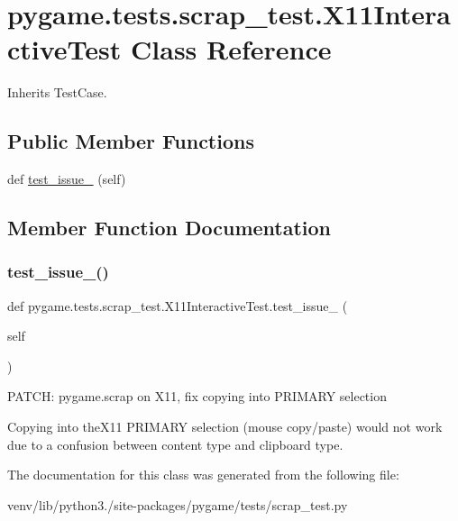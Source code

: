\hypertarget{classpygame_1_1tests_1_1scrap__test_1_1_x11_interactive_test}{}\section{pygame.\+tests.\+scrap\+\_\+test.\+X11\+Interactive\+Test Class Reference}
\label{classpygame_1_1tests_1_1scrap__test_1_1_x11_interactive_test}


Inherits Test\+Case.

\subsection*{Public Member Functions}
\begin{DoxyCompactItemize}
\item 
def \hyperlink{classpygame_1_1tests_1_1scrap__test_1_1_x11_interactive_test_a75341b3a575e637a2e64532f6d7127f6}{test\+\_\+issue\+\_} (self)
\end{DoxyCompactItemize}


\subsection{Member Function Documentation}
\mbox{\label{classpygame_1_1tests_1_1scrap__test_1_1_x11_interactive_test_a75341b3a575e637a2e64532f6d7127f6}} 
\subsubsection{\texorpdfstring{test\+\_\+issue\+\_()}{test\_issue\_208()}}
{\footnotesize\ttfamily def pygame.\+tests.\+scrap\+\_\+test.\+X11\+Interactive\+Test.\+test\+\_\+issue\+\_ (\begin{DoxyParamCaption}\item[{}]{self }\end{DoxyParamCaption})}

\begin{DoxyVerb}PATCH: pygame.scrap on X11, fix copying into PRIMARY selection

   Copying into theX11 PRIMARY selection (mouse copy/paste) would not
   work due to a confusion between content type and clipboard type.\end{DoxyVerb}
 

The documentation for this class was generated from the following file\+:\begin{DoxyCompactItemize}
\item 
venv/lib/python3./site-\/packages/pygame/tests/scrap\+\_\+test.\+py\end{DoxyCompactItemize}
